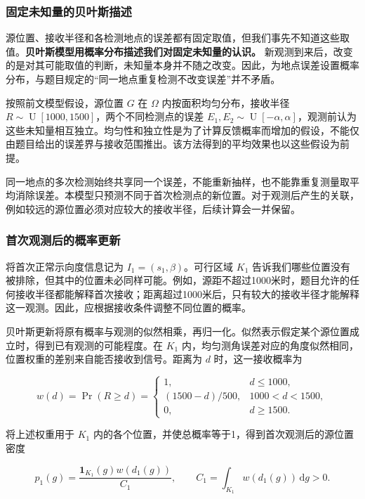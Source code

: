 \documentclass[UTF8,a4paper,zihao=-4,fontset=none]{ctexart}
\begin{document}
\subsubsection{固定未知量的贝叶斯描述}

源位置、接收半径和各检测地点的误差都有固定取值，但我们事先不知道这些取值。\textbf{贝叶斯模型用概率分布描述我们对固定未知量的认识。} 新观测到来后，改变的是对其可能取值的判断，未知量本身并不随之改变。因此，为地点误差设置概率分布，与题目规定的“同一地点重复检测不改变误差”并不矛盾。

按照前文模型假设，源位置 \(G\) 在 \(\Omega\) 内按面积均匀分布，接收半径 \(R\sim\operatorname{U}[1000,1500]\)，两个不同检测点的误差 \(E_1,E_2\sim\operatorname{U}[-\alpha,\alpha]\)，观测前认为这些未知量相互独立。均匀性和独立性是为了计算反馈概率而增加的假设，不能仅由题目给出的误差界与接收范围推出。该方法得到的平均效果也以这些假设为前提。

同一地点的多次检测始终共享同一个误差，不能重新抽样，也不能靠重复测量取平均消除误差。本模型只预测不同于首次检测点的新位置。对于观测后产生的关联，例如较远的源位置必须对应较大的接收半径，后续计算会一并保留。

\subsubsection{首次观测后的概率更新}

将首次正常示向度信息记为 \(I_1=(s_1,\beta)\)。可行区域 \(K_1\) 告诉我们哪些位置没有被排除，但其中的位置未必同样可能。例如，源距不超过1000米时，题目允许的任何接收半径都能解释首次接收；距离超过1000米后，只有较大的接收半径才能解释这一观测。因此，应根据接收条件调整不同位置的概率。

贝叶斯更新将原有概率与观测的似然相乘，再归一化。似然表示假定某个源位置成立时，得到已有观测的可能程度。在 \(K_1\) 内，均匀测角误差对应的角度似然相同，位置权重的差别来自能否接收到信号。距离为 \(d\) 时，这一接收概率为

\begin{equation}
 w(d)=\Pr(R\ge d)=
 \begin{cases}
 1,&d\le1000,\\
 (1500-d)/500,&1000<d<1500,\\
 0,&d\ge1500.
 \end{cases}
\label{eq:q2-pair-weight}
\end{equation}

将上述权重用于 \(K_1\) 内的各个位置，并使总概率等于1，得到首次观测后的源位置密度

\begin{equation}
 p_1(g)=\frac{\mathbf1_{K_1}(g)w(d_1(g))}{C_1},
 \qquad C_1=\int_{K_1}w(d_1(g))\,\mathrm dg>0.
\label{eq:q2-pair-posterior}
\end{equation}
\end{document}
